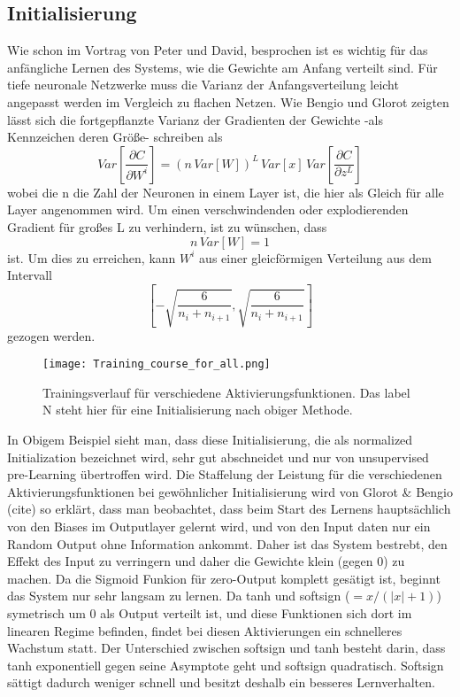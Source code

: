 \documentclass[12pt]{article}
\newcommand{\partderv}[2]{\frac{\partial{#1}}{\partial{#2}}}
\begin{document}
\subsection*{Initialisierung}
Wie schon im Vortrag von Peter und David, besprochen ist es wichtig für das anfängliche Lernen des Systems, wie die Gewichte am Anfang verteilt sind. Für tiefe neuronale Netzwerke muss die Varianz der Anfangsverteilung leicht angepasst werden im Vergleich zu flachen Netzen. Wie Bengio und Glorot zeigten lässt sich die fortgepflanzte Varianz der Gradienten der Gewichte -als Kennzeichen deren Größe- schreiben als
$$Var[\partderv{C}{W^i}]=(n\,Var[W])^L\,Var[x]\,Var[\partderv{C}{z^L}]$$
wobei die n die Zahl der Neuronen in einem Layer ist, die hier als Gleich für alle Layer angenommen wird. Um einen verschwindenden oder explodierenden Gradient für großes L zu verhindern, ist zu wünschen, dass
$$n\,Var[W]=1$$
ist. Um dies zu erreichen, kann $W^i$ aus einer gleicförmigen Verteilung aus dem Intervall 
$$\left[-\sqrt{\frac{6}{n_i+n_{i+1}}},\sqrt{\frac{6}{n_i+n_{i+1}}}\right]$$
gezogen werden.
\begin{figure}[H]\centering\texttt{[image: Training\_course\_for\_all.png]}\caption{Trainingsverlauf für verschiedene Aktivierungsfunktionen. Das label N steht hier für eine Initialisierung nach obiger Methode.}\end{figure}
In Obigem Beispiel sieht man, dass diese Initialisierung, die als normalized Initialization bezeichnet wird, sehr gut abschneidet und nur von unsupervised pre-Learning übertroffen wird. Die Staffelung der Leistung für die verschiedenen Aktivierungsfunktionen bei gewöhnlicher Initialisierung wird von Glorot \& Bengio (cite) so erklärt, dass man beobachtet, dass beim Start des Lernens hauptsächlich von den Biases im Outputlayer gelernt wird, und von den Input daten nur ein Random Output ohne Information ankommt. Daher ist das System bestrebt, den Effekt des Input zu verringern und daher die Gewichte klein (gegen 0) zu machen. Da die Sigmoid Funkion für zero-Output komplett gesätigt ist, beginnt das System nur sehr langsam zu lernen. Da tanh und softsign ($=x/(|x|+1)$) symetrisch um 0 als Output verteilt ist, und diese Funktionen sich dort im linearen Regime befinden, findet bei diesen Aktivierungen ein schnelleres Wachstum statt. Der Unterschied zwischen softsign und tanh besteht darin, dass tanh exponentiell gegen seine Asymptote geht und softsign quadratisch. Softsign sättigt dadurch weniger schnell und besitzt deshalb ein besseres Lernverhalten.
\end{document}
